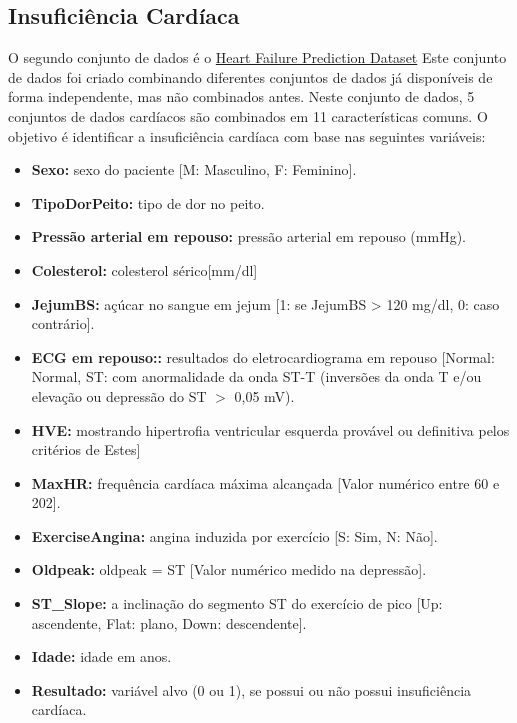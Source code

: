 \subsection{Insuficiência Cardíaca}
O segundo conjunto de dados é o \href{https://www.kaggle.com/datasets/fedesoriano/heart-failure-prediction}{Heart Failure Prediction Dataset}
Este conjunto de dados foi criado combinando diferentes conjuntos de dados já disponíveis de forma independente, mas não combinados antes. Neste conjunto de dados, 5 conjuntos de dados cardíacos são combinados em 11 características comuns. O objetivo é identificar a insuficiência cardíaca com base nas seguintes variáveis:
\begin{itemize}
    \item \textbf{Sexo:} sexo do paciente [M: Masculino, F: Feminino].
    \item \textbf{TipoDorPeito:} tipo de dor no peito.
    \item \textbf{Pressão arterial em repouso:} pressão arterial em repouso (mmHg).
    \item \textbf{Colesterol:} colesterol sérico[mm/dl]
    \item \textbf{JejumBS:} açúcar no sangue em jejum [1: se JejumBS > 120 mg/dl, 0: caso contrário].
    \item \textbf{ECG em repouso::} resultados do eletrocardiograma em repouso [Normal: Normal, ST: com anormalidade da onda ST-T (inversões da onda T e/ou elevação ou depressão do ST $>$ 0,05 mV).
    \item \textbf{HVE:} mostrando hipertrofia ventricular esquerda provável ou definitiva pelos critérios de Estes]
    \item \textbf{MaxHR:} frequência cardíaca máxima alcançada [Valor numérico entre 60 e 202].
    \item \textbf{ExerciseAngina:} angina induzida por exercício [S: Sim, N: Não].
    \item \textbf{Oldpeak:} oldpeak = ST [Valor numérico medido na depressão].
    \item \textbf{ST\_Slope:} a inclinação do segmento ST do exercício de pico [Up: ascendente, Flat: plano, Down: descendente].
    \item \textbf{Idade:} idade em anos.
    \item \textbf{Resultado:} variável alvo (0 ou 1), se possui ou não possui insuficiência cardíaca.
\end{itemize}


